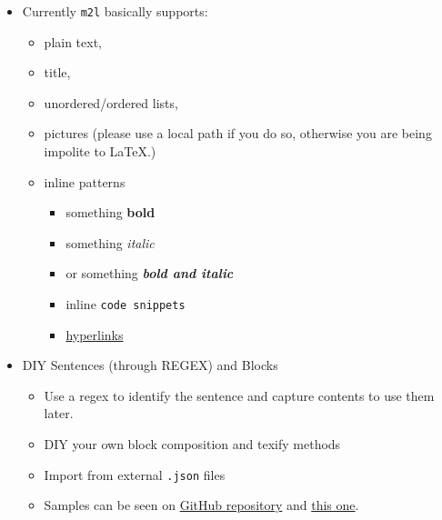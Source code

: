 \documentclass{ctexart}
\begin{document}
	\begin{itemize}
		\item Currently \texttt{m2l} basically supports:
		\begin{itemize}
			\item plain text,
			\item title,
			\item unordered/ordered lists,
			\item pictures (please use a local path if you do so, otherwise you are being impolite to LaTeX.)
			\item inline patterns
			\begin{itemize}
				\item something \textbf{bold}
				\item something \textit{italic}
				\item or something \textbf{\textit{bold and italic}}
				\item inline \texttt{code snippets}
				\item \href{https://http.cat/404}{hyperlinks}
			\end{itemize}
		\end{itemize}
		\item DIY Sentences (through REGEX) and Blocks
		\begin{itemize}
			\item Use a regex to identify the sentence and capture contents to use them later.
			\item DIY your own block composition and texify methods
			\item Import from external \texttt{.json} files
			\item Samples can be seen on \href{https://github.com/TrickEye/md2latex-converter/blob/master/block_extensions.json}{GitHub repository} and \href{https://github.com/TrickEye/md2latex-converter/blob/master/sentence_extensions.json}{this one}.
		\end{itemize}
	\end{itemize}
	
\end{document}
